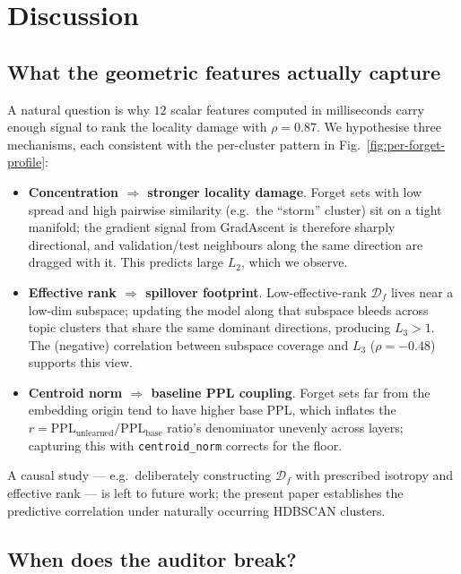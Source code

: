 \documentclass[11pt,a4paper]{article}
\newcommand{\Df}{\mathcal{D}_f}
\newcommand{\PPL}{\mathrm{PPL}}
\newcommand{\Ltwo}{L_2}
\newcommand{\Lthree}{L_3}
\begin{document}
\section{Discussion}
\label{sec:discussion}

\subsection{What the geometric features actually capture}
\label{sec:why-it-works}

A natural question is why $12$ scalar features computed in milliseconds carry enough signal to rank the locality damage with $\rho{=}0.87$. We hypothesise three mechanisms, each consistent with the per-cluster pattern in Fig.~\ref{fig:per-forget-profile}:
\begin{itemize}
    \setlength\itemsep{0.15em}
    \item \textbf{Concentration $\Rightarrow$ stronger locality damage}. Forget sets with low spread and high pairwise similarity (e.g.\ the ``storm'' cluster) sit on a tight manifold; the gradient signal from GradAscent is therefore sharply directional, and validation/test neighbours along the same direction are dragged with it. This predicts large $\Ltwo$, which we observe.
    \item \textbf{Effective rank $\Rightarrow$ spillover footprint}. Low-effective-rank $\Df$ lives near a low-dim subspace; updating the model along that subspace bleeds across topic clusters that share the same dominant directions, producing $\Lthree{>}1$. The (negative) correlation between subspace coverage and $\Lthree$ ($\rho{=}{-}0.48$) supports this view.
    \item \textbf{Centroid norm $\Rightarrow$ baseline PPL coupling}. Forget sets far from the embedding origin tend to have higher base PPL, which inflates the $r{=}\PPL_{\text{unlearned}}/\PPL_{\text{base}}$ ratio's denominator unevenly across layers; capturing this with \texttt{centroid\_norm} corrects for the floor.
\end{itemize}
A causal study --- e.g.\ deliberately constructing $\Df$ with prescribed isotropy and effective rank --- is left to future work; the present paper establishes the predictive correlation under naturally occurring HDBSCAN clusters.

\subsection{When does the auditor break?}
\label{sec:failure}
\end{document}
